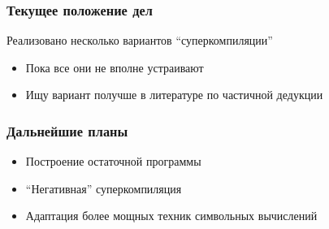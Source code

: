 \documentclass{beamer}
\begin{document}
\begin{frame}[fragile]
  \transwipe[direction=90]
  \frametitle{Текущее положение дел}
Реализовано несколько вариантов ``суперкомпиляции''
  \begin{itemize}  
    \item Пока все они не вполне устраивают
    \item Ищу вариант получше в литературе по частичной дедукции
  \end{itemize}
\end{frame}


\begin{frame}[fragile]
  \transwipe[direction=90]
  \frametitle{Дальнейшие планы}
\begin{itemize}
  \item Построение остаточной программы
  \item ``Негативная'' суперкомпиляция
  \item Адаптация более мощных техник символьных вычислений
\end{itemize}
\end{frame}
\end{document}
